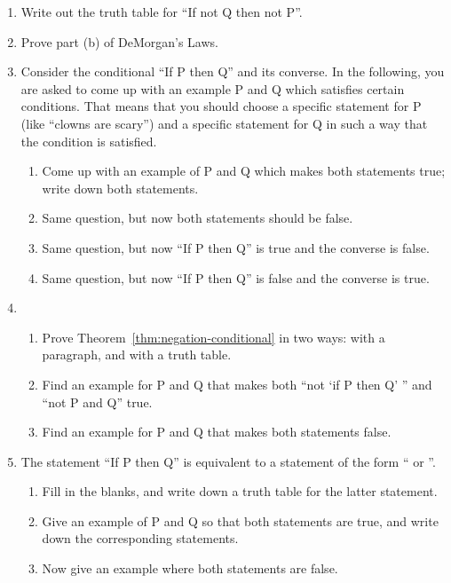 \probsec{~\ref{sec:negat-logic-equiv}}
\begin{enumerate}
    \item Write out the truth table for ``If not Q then not P''.

    \item Prove part (b) of DeMorgan's Laws.

    \item Consider the conditional ``If P then Q'' and its converse. In the following, you are asked to come up with an example P and Q which satisfies certain conditions. That means that you should choose a specific statement for P (like ``clowns are scary'') and a specific statement for Q in such a way that the condition is satisfied.
  \begin{enumerate}
      \item Come up with an example of P and Q which makes both statements true; write down both statements.
      \item Same question, but now both statements should be false.
      \item Same question, but now ``If P then Q'' is true and the converse is false.
      \item Same question, but now ``If P then Q'' is false and the converse is true.
  \end{enumerate}

    \item 
  \begin{enumerate}
      \item Prove Theorem~\ref{thm:negation-conditional} in two ways: with a paragraph, and with a truth table.
      \item Find an example for P and Q that makes both ``not `if P then Q' '' and ``not P and Q'' true.
      \item Find an example for P and Q that makes both statements false.
  \end{enumerate}

    \item The statement ``If P then Q'' is equivalent to a statement of the form ``\underline{\hspace{.5in}} or \underline{\hspace{.5in}}''.
  \begin{enumerate}
      \item Fill in the blanks, and write down a truth table for the latter statement.
      \item Give an example of P and Q so that both statements are true, and write down the corresponding statements.
      \item Now give an example where both statements are false.
  \end{enumerate}

\end{enumerate}
